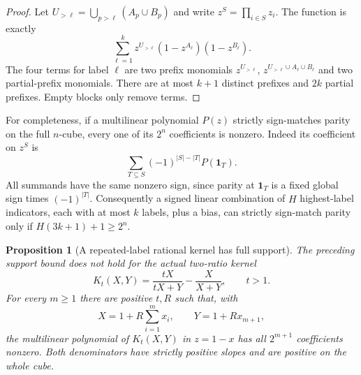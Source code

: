 \documentclass[11pt]{article}
\newtheorem{proposition}[theorem]{Proposition}
\begin{document}
\begin{proof}
Let $U_{>\ell}=\bigcup_{p>\ell}(A_p\cup B_p)$ and write
$z^S=\prod_{i\in S}z_i$. The function is exactly
\[
 \sum_{\ell=1}^k
 z^{U_{>\ell}}(1-z^{A_\ell})(1-z^{B_\ell}).
\]
The four terms for label $\ell$ are two prefix monomials
$z^{U_{>\ell}}$, $z^{U_{>\ell}\cup A_\ell\cup B_\ell}$ and two
partial-prefix monomials. There are at most $k+1$ distinct prefixes
and $2k$ partial prefixes. Empty blocks only remove terms.
\end{proof}

For completeness, if a multilinear polynomial $P(z)$ strictly
sign-matches parity on the full $n$-cube, every one of its $2^n$
coefficients is nonzero. Indeed its coefficient on $z^S$ is
\[
 \sum_{T\subseteq S}(-1)^{|S|-|T|}P(\boldsymbol1_T).
\]
All summands have the same nonzero sign, since parity at
$\boldsymbol1_T$ is a fixed global sign times $(-1)^{|T|}$.
Consequently a signed linear combination of $H$ highest-label
indicators, each with at most $k$ labels, plus a bias, can strictly
sign-match parity only if $H(3k+1)+1\ge2^n$.

\begin{proposition}[A repeated-label rational kernel has full support]
The preceding support bound does not hold for the actual two-ratio
kernel
\[
 K_t(X,Y)=\frac{tX}{tX+Y}-\frac X{X+Y},\qquad t>1.
\]
For every $m\ge1$ there are positive $t,R$ such that, with
\[
 X=1+R\sum_{i=1}^m x_i,\qquad Y=1+Rx_{m+1},
\]
the multilinear polynomial of $K_t(X,Y)$ in $z=1-x$ has all
$2^{m+1}$ coefficients nonzero. Both denominators have strictly
positive slopes and are positive on the whole cube.
\end{proposition}
\end{document}
